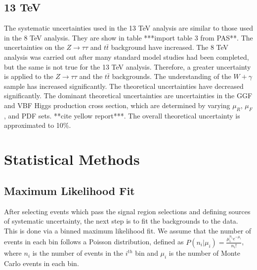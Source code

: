 \documentclass[oneside, letterpaper, oldfontcommands]{memoir}
\begin{document}
{{{\subsection{13 TeV}
\qquad The systematic uncertainties used in the 13 TeV analysis are similar to those used in the 8 TeV analysis. They are show in table ***import table 3 from PAS**. The uncertainties on the $Z \rightarrow \tau\tau$ and $t\bar{t}$ background have increased. The 8 TeV analysis was carried out after many standard model studies had been completed, but the same is not true for the 13 TeV analysis. Therefore, a greater uncertainty is applied to the $Z \rightarrow \tau\tau$ and the $t\bar{t}$ backgrounds. The understanding of the $W+\gamma$ sample has increased significantly. The theoretical uncertainties have decreased significantly. The dominant theoretical uncertainties are  uncertainties in the GGF and VBF Higgs production cross section, which are determined by varying $\mu_{R}$, $\mu_{F}$, and PDF sets. **cite yellow report***. The overall theoretical uncertainty is approximated to 10\%. 
\section{Statistical Methods}
\subsection{Maximum Likelihood Fit}
\qquad After selecting events which pass the signal region selections and defining sources of systematic uncertainty, the next step is to fit the backgrounds to the data. This is done via a binned maximum likelihood fit.\cite{BevingtonRobinson200207}\cite{Conway:2011in} We assume that the number of events in each bin follows a Poisson distribution, defined as $P(n_{i}|\mu_{i}) = \frac{\mu_{i}^{n_{i}}e^{-\mu_{i}}}{n_{i}!}$, where $n_{i}$ is the number of events in the $i^{th}$ bin and $\mu_{i}$ is the number of Monte Carlo events in each bin. 

}}}
\end{document}
